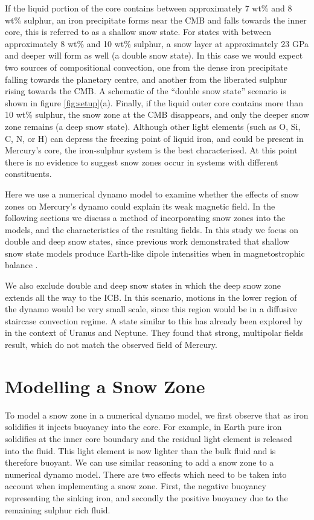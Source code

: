 If the liquid portion of the core contains between approximately 7 wt\% and 8 wt\% sulphur, an iron precipitate forms near the CMB and falls towards the inner core, this is referred to as a shallow snow state. For states with between approximately 8 wt\% and 10 wt\% sulphur, a snow layer at approximately 23 GPa and deeper will form as well (a double snow state). In this case we would expect two sources of compositional convection, one from the dense iron precipitate falling towards the planetary centre, and another from the liberated sulphur rising towards the CMB. A schematic of the ``double snow state'' scenario is shown in figure \ref{fig:setup}(a). Finally, if the liquid outer core contains more than 10 wt\% sulphur, the snow zone at the CMB disappears, and only the deeper snow zone remains (a deep snow state). Although other light elements (such as O, Si, C, N, or H) can depress the freezing point of liquid iron, and could be present in Mercury's core, the iron-sulphur system is the best characterised. At this point there is no evidence to suggest snow zones occur in systems with different constituents. 

Here we use a numerical dynamo model to examine whether the effects of snow zones on Mercury's dynamo could explain its weak magnetic field. In the following sections we discuss a method of incorporating snow zones into the models, and the characteristics of the resulting fields. In this study we focus on double and deep snow states, since previous work demonstrated that shallow snow state models produce Earth-like dipole intensities when in magnetostrophic balance \citep{stanleyandmohammadi}.

We also exclude double and deep snow states in which the deep snow zone extends all the way to the ICB. In this scenario, motions in the lower region of the dynamo would be very small scale, since this region would be in a diffusive staircase convection regime. A state similar to this has already been explored by \citet{stanleyandbloxham2006} in the context of Uranus and Neptune. They found that strong, multipolar fields result, which do not match the observed field of Mercury.

\section{Modelling a Snow Zone}
To model a snow zone in a numerical dynamo model, we first observe that as iron solidifies it injects buoyancy into the core. For example, in Earth pure iron solidifies at the inner core boundary and the residual light element is released into the fluid. This light element is now lighter than the bulk fluid and is therefore buoyant. We can use similar reasoning to add a snow zone to a numerical dynamo model. There are two effects which need to be taken into account when implementing a snow zone. First, the negative buoyancy representing the sinking iron, and secondly the positive buoyancy due to the remaining sulphur rich fluid.

